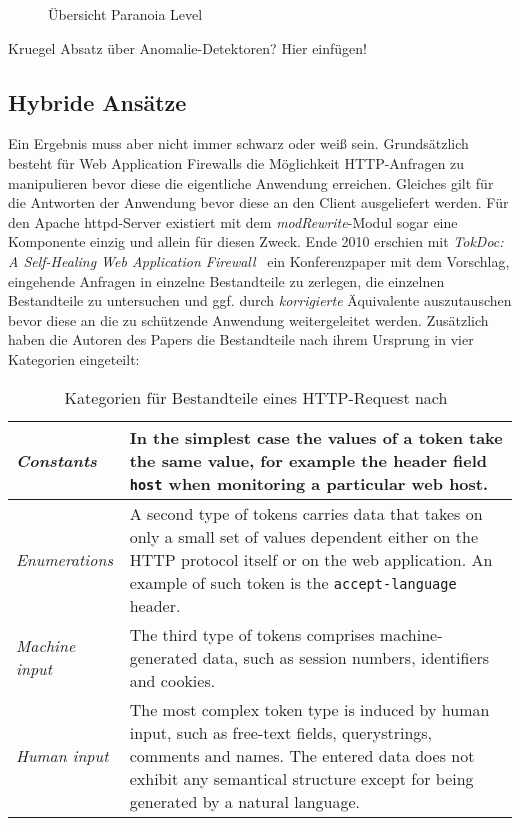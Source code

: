 \begin{figure}[ht]
  \centering
  
  \caption{Übersicht Paranoia Level~\cite{owaspcrs}}
  \label{fig.paranoia}
\end{figure}



\begin{neu}
  Kruegel Absatz über Anomalie-Detektoren? Hier einfügen!
\end{neu}

\subsection{Hybride Ansätze} %
Ein Ergebnis muss aber nicht immer schwarz oder weiß sein.  Grundsätzlich besteht für Web Application Firewalls die Möglichkeit HTTP-Anfragen zu manipulieren bevor diese die eigentliche Anwendung erreichen. Gleiches gilt für die Antworten der Anwendung bevor diese an den Client ausgeliefert werden. Für den Apache httpd-Server existiert mit dem \emph{modRewrite}-Modul sogar eine Komponente einzig und allein für diesen Zweck. Ende 2010 erschien mit \glqq\emph{TokDoc: A Self-Healing Web Application Firewall}\grqq~\cite{Krueger2010} ein Konferenzpaper mit dem Vorschlag, eingehende Anfragen in einzelne Bestandteile zu zerlegen, die einzelnen Bestandteile zu untersuchen und ggf. durch \emph{korrigierte} Äquivalente auszutauschen bevor diese an die zu schützende Anwendung weitergeleitet werden. Zusätzlich haben die Autoren des Papers die Bestandteile nach ihrem Ursprung in vier Kategorien eingeteilt:\\

\begin{table}[h]
  \centering
  \begin{tabular}{|l|p{8cm}|}
    \hline
    \emph{Constants} & In the simplest case the values of a token take the same value, for example the header field \verb=host= when monitoring a particular web host. \\
    \hline
    \emph{Enumerations} &  A second type of tokens carries data that takes on only a small set of values dependent either on the HTTP protocol itself or on the web application. An example of such token is the \verb=accept-language= header.\\
    \hline
    \emph{Machine input} & The third type of tokens comprises machine-generated data, such as session numbers, identifiers and cookies. \\
    \hline
    \emph{Human input} & The most complex token type is induced by human input, such as free-text fields, querystrings, comments and names. The entered data does not exhibit any semantical structure except for being generated by a natural language.  \\
    \hline
  \end{tabular}
  \caption{Kategorien für Bestandteile eines HTTP-Request nach~\cite{Krueger2010}}
  \label{tab:tocdoc}
\end{table}

